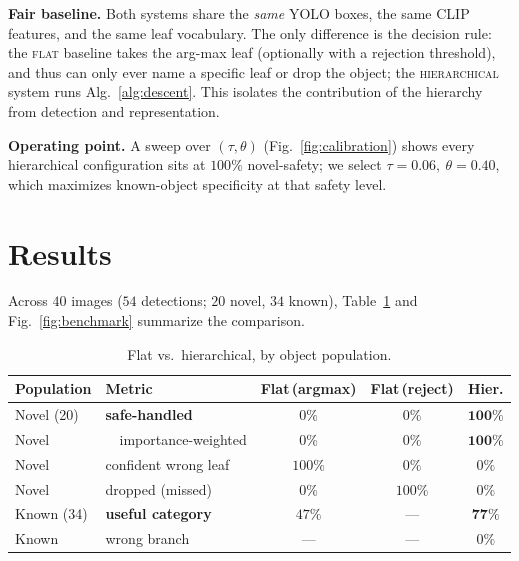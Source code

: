 \documentclass[conference]{IEEEtran}
\begin{document}
\textbf{Fair baseline.} Both systems share the \emph{same} YOLO boxes, the same
CLIP features, and the same leaf vocabulary. The only difference is the decision
rule: the \textsc{flat} baseline takes the arg-max leaf (optionally with a
rejection threshold), and thus can only ever name a specific leaf or drop the
object; the \textsc{hierarchical} system runs Alg.~\ref{alg:descent}. This
isolates the contribution of the hierarchy from detection and representation.

\textbf{Operating point.} A sweep over $(\tau,\theta)$
(Fig.~\ref{fig:calibration}) shows every hierarchical configuration sits at
$100\%$ novel-safety; we select $\tau{=}0.06,\ \theta{=}0.40$, which maximizes
known-object specificity at that safety level.

\section{Results}
\label{sec:results}

Across $40$ images ($54$ detections; $20$ novel, $34$ known),
Table~\ref{tab:results} and Fig.~\ref{fig:benchmark} summarize the comparison.

\begin{table}[t]
\caption{Flat vs.\ hierarchical, by object population.}
\label{tab:results}
\centering
\begin{tabular}{@{}llccc@{}}
\toprule
Population & Metric & Flat\,(argmax) & Flat\,(reject) & \textbf{Hier.} \\
\midrule
Novel (20) & \textbf{safe-handled}     & $0\%$   & $0\%$   & $\mathbf{100\%}$ \\
Novel      & \ \ importance-weighted   & $0\%$   & $0\%$   & $\mathbf{100\%}$ \\
Novel      & confident wrong leaf      & $100\%$ & $0\%$   & $0\%$   \\
Novel      & dropped (missed)          & $0\%$   & $100\%$ & $0\%$   \\
\midrule
Known (34) & \textbf{useful category}  & $47\%$  & ---     & $\mathbf{77\%}$ \\
Known      & wrong branch              & ---     & ---     & $0\%$   \\
\bottomrule
\end{tabular}
\end{table}
\end{document}
